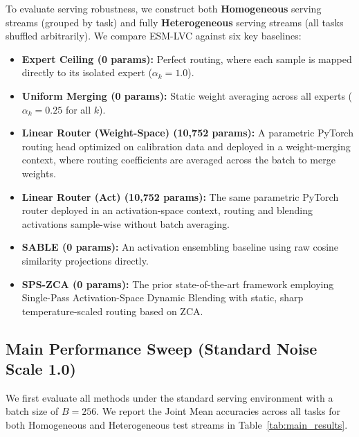 To evaluate serving robustness, we construct both \textbf{Homogeneous} serving streams (grouped by task) and fully \textbf{Heterogeneous} serving streams (all tasks shuffled arbitrarily). We compare ESM-LVC against six key baselines:
\begin{itemize}
    \item \textbf{Expert Ceiling (0 params):} Perfect routing, where each sample is mapped directly to its isolated expert ($\alpha_k = 1.0$).
    \item \textbf{Uniform Merging (0 params):} Static weight averaging across all experts ($\alpha_k = 0.25$ for all $k$).
    \item \textbf{Linear Router (Weight-Space) (10,752 params):} A parametric PyTorch routing head optimized on calibration data and deployed in a weight-merging context, where routing coefficients are averaged across the batch to merge weights.
    \item \textbf{Linear Router (Act) (10,752 params):} The same parametric PyTorch router deployed in an activation-space context, routing and blending activations sample-wise without batch averaging.
    \item \textbf{SABLE (0 params):} An activation ensembling baseline using raw cosine similarity projections directly.
    \item \textbf{SPS-ZCA (0 params):} The prior state-of-the-art framework employing Single-Pass Activation-Space Dynamic Blending with static, sharp temperature-scaled routing based on ZCA.
\end{itemize}

\subsection{Main Performance Sweep (Standard Noise Scale 1.0)}
We first evaluate all methods under the standard serving environment with a batch size of $B=256$. We report the Joint Mean accuracies across all tasks for both Homogeneous and Heterogeneous test streams in Table~\ref{tab:main_results}.

